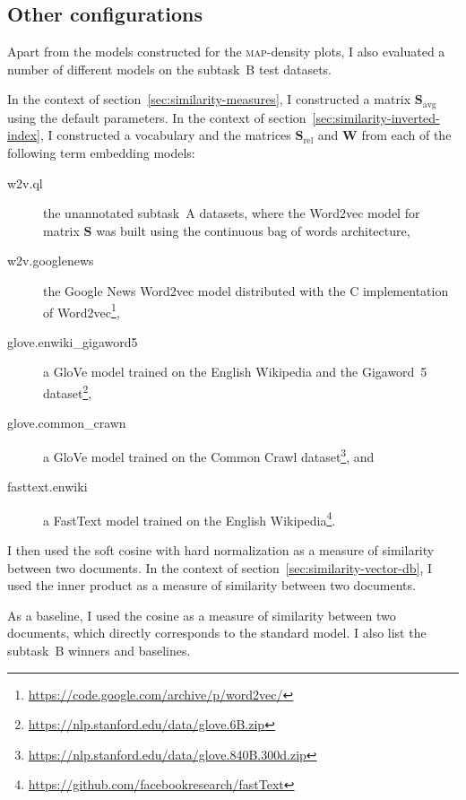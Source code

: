 \documentclass[
  digital, %
  notable, %
  lof,     %
  lot,     %
  nopalatino, color
]{fithesis3}
\newcommand{\op}[1]{\ensuremath{\operatorname{#1}}}
\newcommand{\avg}{\op{avg}}
\def\abbr#1{\textsc{\MakeLowercase{#1}}}
\let\note=\footnote
\begin{document}
\subsection{Other configurations}
Apart from the models constructed for the
\abbr{MAP}\index{map@\abbr {MAP}}-density plots, I also evaluated a number of
different models on the subtask~B test datasets.

In the context of section~\ref{sec:similarity-measures}, I constructed a matrix
$\mathbf S_{\avg}$\index{.savg@$\mathbf S_{\avg}$} using the default
parameters.
In the context of section~\ref{sec:similarity-inverted-index}, I constructed a
vocabulary and the matrices $\mathbf S_{\textrm{rel}}$
 and $\mathbf W$ from each of the
following term embedding models:
\begin{description}
  \item[w2v.ql] the unannotated subtask~A datasets, where the
    Word2vec model for matrix $\mathbf S$
    was built using the continuous bag of words architecture,
  \item[w2v.googlenews] the Google News Word2vec model
    distributed with the C implementation of
    Word2vec\note{\url{https://code.google.com/archive/p/word2vec/}},
  \item[glove.enwiki\_gigaword5] a GloVe
    model trained on the
    English Wikipedia and the Gigaword~5
    dataset\note{\url{https://nlp.stanford.edu/data/glove.6B.zip}},
  \item[glove.common\_crawn] a GloVe model trained on the
    Common Crawl
    dataset\note{\url{https://nlp.stanford.edu/data/glove.840B.300d.zip}}, and
  \item[fasttext.enwiki] a FastText
    model trained on the English
    Wikipedia\note{\url{https://github.com/facebookresearch/fastText}}.
\end{description}
I then used the soft cosine with hard
normalization as a measure of similarity between two
documents.
In the context of section~\ref{sec:similarity-vector-db}, I used the inner
product as a measure of similarity between two documents.

As a baseline, I used the cosine as a measure of
similarity between two documents, which directly corresponds to the standard
model. I also list the subtask~B winners and
baselines.
\end{document}

